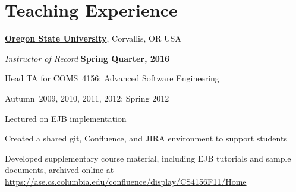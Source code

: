 \documentclass[10pt]{article}
\begin{document}
\section{Teaching Experience}

\href{http://www.oregonstate.edu/}{\textbf{Oregon State University}},
Corvallis, OR USA
\begin{outerlist}
\item[] \textit{Instructor of Record}%
    \hfill \textbf{Spring Quarter, 2016}
    \begin{innerlist}%
       \item Head TA for COMS~4156: Advanced Software Engineering %
        \begin{innerlist}
            \item Autumn~2009, 2010, 2011, 2012; Spring 2012 
            \item Lectured on EJB implementation
            \item Created a shared git, Confluence, and JIRA environment to support students
            \item Developed supplementary course
                material, including EJB tutorials and sample documents, archived online at \\
                 \url{https://ase.cs.columbia.edu/confluence/display/CS4156F11/Home}
        \end{innerlist}   
     \end{innerlist}
\end{outerlist}
\vspace{10pt}
\end{document}
